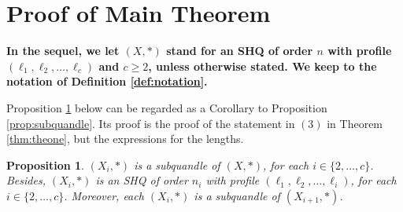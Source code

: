 \documentclass{article}
\newtheorem{proposition}[theorem]{Proposition}
\begin{document}
\section{Proof of Main Theorem}\label{sctn:characterization}



\textbf{In the sequel, we let $(X,*)$ stand for an SHQ of order $n$ with profile $(\ell_1,\ell_2,\dots,\ell_c)$ and $c\geq 2$, unless otherwise stated. We keep to the notation of Definition \ref{def:notation}.}\bigbreak

Proposition \ref{prop:SHQsubquandle} below can be regarded as a Corollary to Proposition \ref{prop:subquandle}. Its proof is the proof of the statement in $(3)$ in Theorem \ref{thm:theone}, but the expressions for the lengths.


\begin{proposition}\label{prop:SHQsubquandle}
$(X_i,*)$ is a subquandle of $(X,*)$, for each $i\in\{2,\dots,c\}$. Besides, $(X_i,*)$ is an SHQ of order $n_i$ with profile $(\ell_1,\ell_2,\dots,\ell_i)$, for each $i\in\{2,\dots,c\}$. Moreover, each $(X_i, *)$ is a subquandle of $(X_{i+1},*)$.
\end{proposition}
\end{document}
